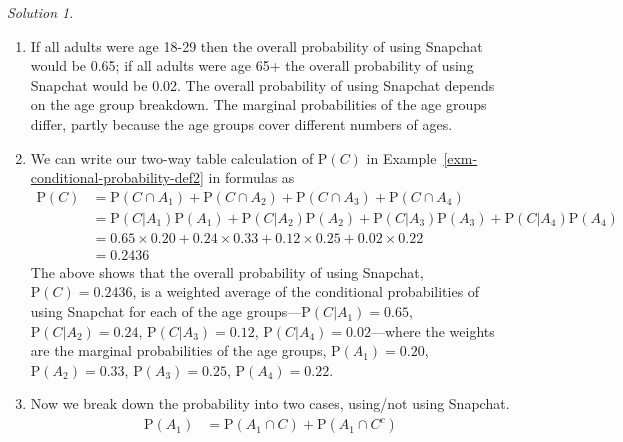 \documentclass[
  letterpaper,
  DIV=11,
  numbers=noendperiod]{scrreprt}
\providecommand{\tightlist}{%
  \setlength{\itemsep}{0pt}\setlength{\parskip}{0pt}}
\theoremstyle{plain}
\theoremstyle{definition}
\theoremstyle{definition}
\theoremstyle{definition}
\theoremstyle{remark}
\newtheorem{refsolution}{Solution}[chapter]
\begin{document}
\begin{tcolorbox}[enhanced jigsaw, opacityback=0, rightrule=.15mm, coltitle=black, colframe=quarto-callout-tip-color-frame, toprule=.15mm, colbacktitle=quarto-callout-tip-color!10!white, opacitybacktitle=0.6, left=2mm, toptitle=1mm, breakable, title={Solution (click to expand)}, bottomtitle=1mm, colback=white, leftrule=.75mm, titlerule=0mm, arc=.35mm, bottomrule=.15mm]

\begin{refsolution}
\leavevmode

\begin{enumerate}
\def\labelenumi{\arabic{enumi}.}
\tightlist
\item
  If all adults were age 18-29 then the overall probability of using
  Snapchat would be 0.65; if all adults were age 65+ the overall
  probability of using Snapchat would be 0.02. The overall probability
  of using Snapchat depends on the age group breakdown. The marginal
  probabilities of the age groups differ, partly because the age groups
  cover different numbers of ages.
\item
  We can write our two-way table calculation of \(\textrm{P}(C)\) in
  Example~\ref{exm-conditional-probability-def2} in formulas as
  \begin{align*}
   \textrm{P}(C) & = \textrm{P}(C \cap A_1) + \textrm{P}(C \cap A_2) + \textrm{P}(C \cap A_3) + \textrm{P}(C \cap A_4)\\
   & = \textrm{P}(C|A_1)\textrm{P}(A_1) + \textrm{P}(C|A_2)\textrm{P}(A_2) + \textrm{P}(C|A_3)\textrm{P}(A_3) +\textrm{P}(C|A_4)\textrm{P}(A_4)\\
   & = 0.65\times 0.20 + 0.24\times 0.33 + 0.12 \times 0.25 + 0.02\times 0.22\\
   & = 0.2436
   \end{align*} The above shows that the overall probability of using
  Snapchat, \(\textrm{P}(C) = 0.2436\), is a weighted average of the
  conditional probabilities of using Snapchat for each of the age
  groups---\(\textrm{P}(C|A_1) = 0.65\), \(\textrm{P}(C|A_2) = 0.24\),
  \(\textrm{P}(C|A_3) = 0.12\), \(\textrm{P}(C|A_4) = 0.02\)---where the
  weights are the marginal probabilities of the age groups,
  \(\textrm{P}(A_1) = 0.20\), \(\textrm{P}(A_2) = 0.33\),
  \(\textrm{P}(A_3) = 0.25\), \(\textrm{P}(A_4) = 0.22\).
\item
  Now we break down the probability into two cases, using/not using
  Snapchat. \begin{align*}
   \textrm{P}(A_1) & = \textrm{P}(A_1\cap C) + \textrm{P}(A_1 \cap C^c)\\

\end{align*}
\end{enumerate}
\end{refsolution}
\end{tcolorbox}
\end{document}
